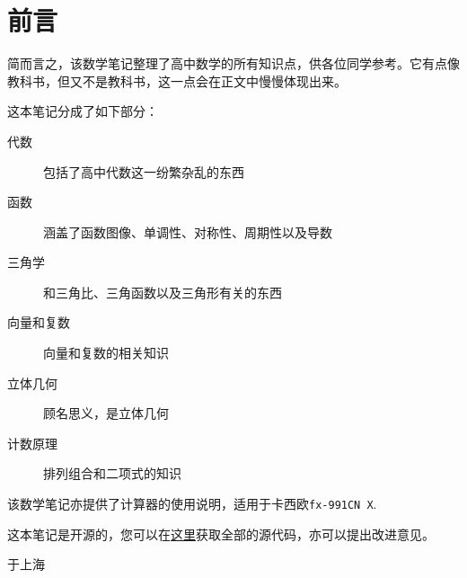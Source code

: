 \section*{前言}
简而言之，该数学笔记整理了高中数学的所有知识点，供各位同学参考。它有点像教科书，但又不是教科书，这一点会在正文中慢慢体现出来。

这本笔记分成了如下部分：

\begin{description}
	\item[代数] 包括了高中代数这一纷繁杂乱的东西
	\item[函数] 涵盖了函数图像、单调性、对称性、周期性以及导数
	\item[三角学] 和三角比、三角函数以及三角形有关的东西
	\item[向量和复数] 向量和复数的相关知识
	\item[立体几何] 顾名思义，是立体几何
	\item[计数原理] 排列组合和二项式的知识
\end{description}

该数学笔记亦提供了计算器的使用说明，适用于卡西欧\verb|fx-991CN X|.

这本笔记是开源的，您可以在\href{https://github.com/jason-bowen-zheng/math-notes}{这里}获取全部的源代码，亦可以提出改进意见。
\hypersetup{hidelinks}

\begin{flushright}
	\date{2022年11月}于上海
\end{flushright}
